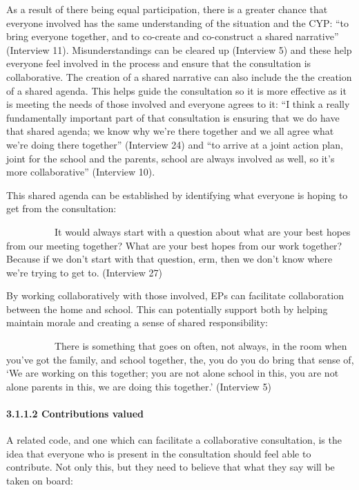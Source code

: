 \documentclass[
]{article}
\begin{document}
As a result of there being equal participation, there is a greater
chance that everyone involved has the same understanding of the
situation and the CYP: ``to bring everyone together, and to co-create
and co-construct a shared narrative'' (Interview 11). Misunderstandings
can be cleared up (Interview 5) and these help everyone feel involved in
the process and ensure that the consultation is collaborative. The
creation of a shared narrative can also include the the creation of a
shared agenda. This helps guide the consultation so it is more effective
as it is meeting the needs of those involved and everyone agrees to it:
``I think a really fundamentally important part of that consultation is
ensuring that we do have that shared agenda; we know why we're there
together and we all agree what we're doing there together'' (Interview
24) and ``to arrive at a joint action plan, joint for the school and the
parents, school are always involved as well, so it's more
collaborative'' (Interview 10).

This shared agenda can be established by identifying what everyone is
hoping to get from the consultation:

            It would always start with a question about what are your
best hopes from our meeting together? What are your best hopes from our
work together? Because if we don't start with that question, erm, then
we don't know where we're trying to get to. (Interview 27)

By working collaboratively with those involved, EPs can facilitate
collaboration between the home and school. This can potentially support
both by helping maintain morale and creating a sense of shared
responsibility:

            There is something that goes on often, not always, in the
room when you've got the family, and school together, the, you do you do
bring that sense of, `We are working on this together; you are not alone
school in this, you are not alone parents in this, we are doing this
together.' (Interview 5)

\hypertarget{contributions-valued}{%
\paragraph{3.1.1.2 Contributions valued}\label{contributions-valued}}

A related code, and one which can facilitate a collaborative
consultation, is the idea that everyone who is present in the
consultation should feel able to contribute. Not only this, but they
need to believe that what they say will be taken on board:
\end{document}

